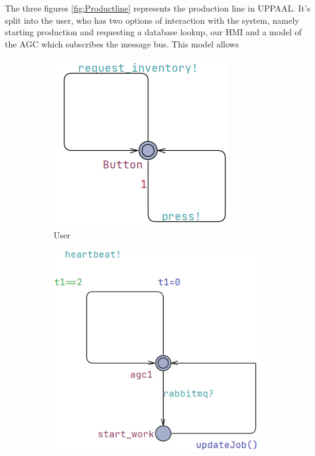 The three figures \ref{fig:Productline} represents the production line in UPPAAL. It's split into the user, who has two options of interaction with the system, namely starting production and requesting a database lookup, our HMI and a model of the AGC which subscribes the message bus. This model allows 
\begin{figure}[h]
  \centering
  \begin{subfigure}[b]{0.4\linewidth}
    \includegraphics[width=\linewidth]{images/User.png}
     \caption{User}
  \end{subfigure}
  \begin{subfigure}[b]{0.5\linewidth}
    \includegraphics[width=\linewidth]{images/AGC.png}

\end{subfigure}
\end{figure}
